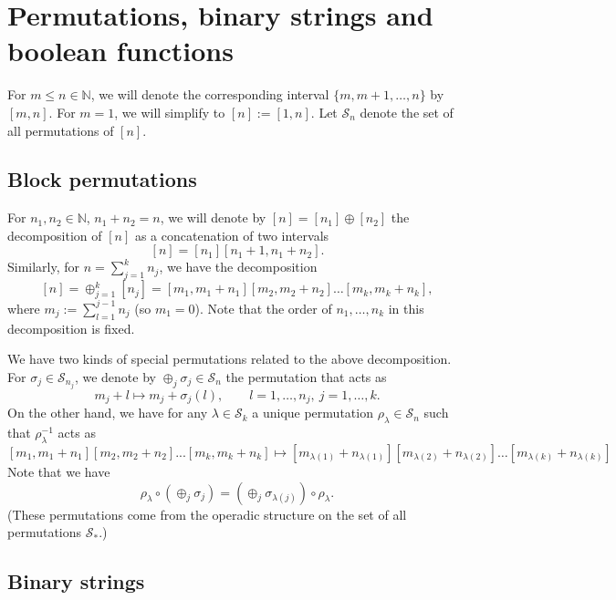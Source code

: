\documentclass[12pt]{article}
\theoremstyle{definition}
\theoremstyle{remark}
\def\permut{\mathscr{S}}
\begin{document}
\appendix


\section{Permutations, binary strings and boolean functions}


For $m\le n\in \mathbb N$, we will denote the corresponding interval $\{m,m+1,\dots,n\}$ by
$[m,n]$. For $m=1$, we will simplify to  $[n]:=[1,n]$. Let $\permut_n$ denote the set of all permutations of $[n]$.


\subsection{Block permutations}
\label{sec:permut}


 For $n_1,n_2\in \mathbb N$, $n_1+n_2=n$, 
we will denote by $[n]=[n_1]\oplus [n_2]$ the decomposition of $[n]$ as a concatenation of two 
intervals
\[
[n]=[n_1][n_1+1,n_1+n_2].
\]
Similarly, for $n=\sum_{j=1}^kn_j$, we have the decomposition
\[
[n]=\oplus_{j=1}^k[n_j]=[m_1,m_1+n_1][m_2,m_2+n_2]\dots[m_k,m_k+n_k],
\]
where $m_j:=\sum_{l=1}^{j-1} n_j$ (so $m_1=0$). Note that the order of $n_1,\dots, n_k$ in
this decomposition is
fixed. 

We have two kinds of special permutations related to the above decomposition. For
$\sigma_j\in \permut_{n_j}$, we denote by $\oplus_j \sigma_j\in \permut_n$ the permutation that acts as
\[
m_j+l\mapsto m_j+\sigma_j(l),\qquad l=1,\dots,n_j,\ j=1,\dots, k. 
\]
On the other hand, we have for any $\lambda\in \permut_k$ a unique permutation
$\rho_\lambda\in\permut_n$  such that $\rho_\lambda^{-1}$ acts as
\[
[m_1,m_1+n_1][m_2,m_2+n_2]...[m_k,m_k+n_k]\mapsto
[m_{\lambda(1)}+n_{\lambda(1)}][m_{\lambda(2)}+n_{\lambda(2)}]\dots[m_{\lambda(k)}+n_{\lambda(k)}]
\]
Note that we have
\[
\rho_\lambda\circ(\oplus_j\sigma_j)=(\oplus_j \sigma_{\lambda(j)})\circ\rho_\lambda.
\]
(These permutations  come from the operadic structure on the set of
all permutations $\permut_*$.)


\subsection{Binary strings}
\end{document}
